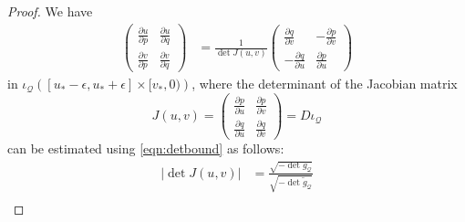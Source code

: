 \documentclass{article}
\newcommand{\Q}{\mathcal{Q}}
\begin{document}
\begin{proof}We have 
\begin{equation}\label{eqn:derivativeinversion}
    \begin{split}
        \begin{pmatrix}
\frac{\partial u}{\partial p} & \frac{\partial u}{\partial q} \\
\frac{\partial v}{\partial p} & \frac{\partial v}{\partial q}
\end{pmatrix}
&=\frac{1}{\det J(u,v)}\begin{pmatrix}
\frac{\partial q}{\partial v} & -\frac{\partial p}{\partial v} \\
-\frac{\partial q}{\partial u} & \frac{\partial p}{\partial u}
\end{pmatrix}
    \end{split}
\end{equation}
in $\iota_\Q\left([u_*-\epsilon,u_*+\epsilon]\times[v_*,0)\right)$, where the determinant of the Jacobian matrix $$J(u,v)=\begin{pmatrix}
\frac{\partial p}{\partial u} & \frac{\partial p}{\partial v} \\
\frac{\partial q}{\partial u} & \frac{\partial q}{\partial v}
\end{pmatrix} = D \iota_{\Q}$$ can be estimated using \eqref{eqn:detbound} as follows:
\begin{equation}
    \begin{split}
        \left|\det J(u,v)\right|&=\frac{\sqrt{-\det g_\Q}}{\sqrt{-\det\tilde{g}_\Q}}\\

\end{split}
\end{equation}
\end{proof}
\end{document}
